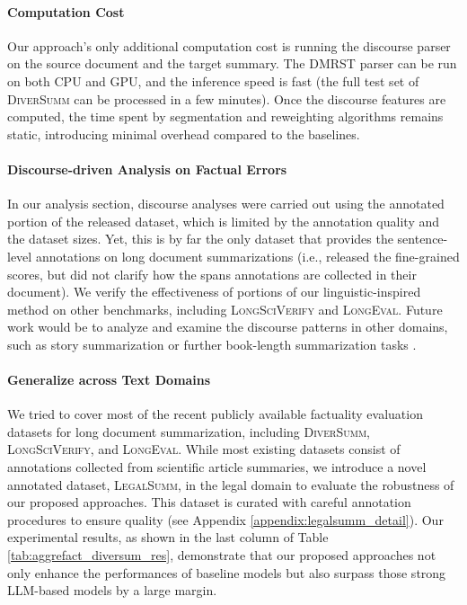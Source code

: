 \paragraph{Computation Cost}
Our approach's only additional computation cost is running the discourse parser on the source document and the target summary. The DMRST parser \cite{liu-etal-2021-dmrst} can be run on both CPU and GPU, and the inference speed is fast (the full test set of \textsc{DiverSumm} can be processed in a few minutes). Once the discourse features are computed, the time spent by segmentation and reweighting algorithms remains static, introducing minimal overhead compared to the baselines. 

\paragraph{Discourse-driven Analysis on Factual Errors} In our analysis section, discourse analyses were carried out using the annotated portion of the released dataset, which is limited by the annotation quality and the dataset sizes. Yet, this is by far the only dataset that provides the sentence-level annotations on long document summarizations (i.e., \citet{krishna-etal-2023-longeval} released the fine-grained scores, but did not clarify how the spans annotations are collected in their document). We verify the effectiveness of portions of our linguistic-inspired method on other benchmarks, including \textsc{LongSciVerify} and \textsc{LongEval}. Future work would be to analyze and examine the discourse patterns in other domains, such as story summarization or further book-length summarization tasks \cite{chang2024booookscore, kim2024fables}. 

\paragraph{Generalize across Text Domains}
We tried to cover most of the recent publicly available factuality evaluation datasets for long document summarization, including \textsc{DiverSumm}, \textsc{LongSciVerify}, and \textsc{LongEval}. While most existing datasets consist of annotations collected from scientific article summaries, we introduce a novel annotated dataset, \textsc{LegalSumm}, in the legal domain to evaluate the robustness of our proposed approaches. This dataset is curated with careful annotation procedures to ensure quality (see Appendix \ref{appendix:legalsumm_detail}). Our experimental results, as shown in the last column of Table  \ref{tab:aggrefact_diversum_res}, demonstrate that our proposed approaches not only enhance the performances of baseline models but also surpass those strong LLM-based models by a large margin. 


